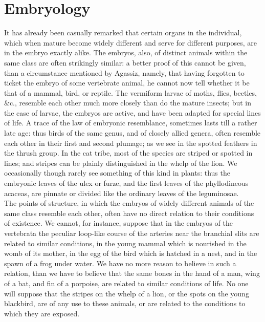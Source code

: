 \section{Embryology}
\indent It has already been casually remarked that certain organs in the individual, which when mature become widely different and serve for different purposes, are in the embryo exactly alike. The embryos, also, of distinct animals within the same class are often strikingly similar: a better proof of this cannot be given, than a circumstance mentioned by Agassiz, namely, that having forgotten to ticket the embryo of some vertebrate animal, he cannot now tell whether it be that of a mammal, bird, or reptile. The vermiform larvae of moths, flies, beetles, \&c., resemble each other much more closely than do the mature insects; but in the case of larvae, the embryos are active, and have been adapted for special lines of life. A trace of the law of embryonic resemblance, sometimes lasts till a rather late age: thus birds of the same genus, and of closely allied genera, often resemble each other in their first and second plumage; as we see in the spotted feathers in the thrush group. In the cat tribe, most of the species are striped or spotted in lines; and stripes can be plainly distinguished in the whelp of the lion. We occasionally though rarely see something of this kind in plants: thus the embryonic leaves of the ulex or furze, and the first leaves of the phyllodineous acaceas, are pinnate or divided like the ordinary leaves of the leguminosae.~\\
\indent The points of structure, in which the embryos of widely different animals of the same class resemble each other, often have no direct relation to their conditions of existence. We cannot, for instance, suppose that in the embryos of the vertebrata the peculiar loop-like course of the arteries near the branchial slits are related to similar conditions, in the young mammal which is nourished in the womb of its mother, in the egg of the bird which is hatched in a nest, and in the spawn of a frog under water. We have no more reason to believe in such a relation, than we have to believe that the same bones in the hand of a man, wing of a bat, and fin of a porpoise, are related to similar conditions of life. No one will suppose that the stripes on the whelp of a lion, or the spots on the young blackbird, are of any use to these animals, or are related to the conditions to which they are exposed.~\\
